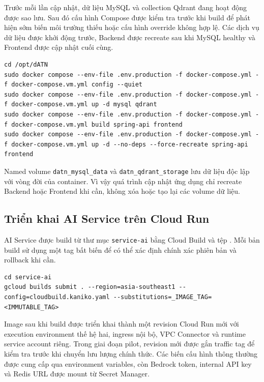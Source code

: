 Trước mỗi lần cập nhật, dữ liệu MySQL và collection Qdrant đang hoạt động được sao lưu. Sau đó cấu hình Compose được kiểm tra trước khi build để phát hiện sớm biến môi trường thiếu hoặc cấu hình override không hợp lệ. Các dịch vụ dữ liệu được khởi động trước, Backend được recreate sau khi MySQL healthy và Frontend được cập nhật cuối cùng.

\begin{lstlisting}[style=terminal,caption={Build và khởi động các dịch vụ trên GCE VM},label={lst:gce-compose-deploy}]
cd /opt/dATN
sudo docker compose --env-file .env.production -f docker-compose.yml -f docker-compose.vm.yml config --quiet
sudo docker compose --env-file .env.production -f docker-compose.yml -f docker-compose.vm.yml up -d mysql qdrant
sudo docker compose --env-file .env.production -f docker-compose.yml -f docker-compose.vm.yml build spring-api frontend
sudo docker compose --env-file .env.production -f docker-compose.yml -f docker-compose.vm.yml up -d --no-deps --force-recreate spring-api frontend
\end{lstlisting}

Named volume \texttt{datn\_mysql\_data} và \texttt{datn\_qdrant\_storage} lưu dữ liệu độc lập với vòng đời của container. Vì vậy quá trình cập nhật ứng dụng chỉ recreate Backend hoặc Frontend khi cần, không xóa hoặc tạo lại các volume dữ liệu.

\subsection{Triển khai AI Service trên Cloud Run}

AI Service được build từ thư mục \texttt{service-ai} bằng Cloud Build và tệp . Mỗi bản build sử dụng một tag bất biến để có thể xác định chính xác phiên bản và rollback khi cần.

\begin{lstlisting}[style=terminal,caption={Build image AI Service bằng Cloud Build},label={lst:cloud-build-ai}]
cd service-ai
gcloud builds submit . --region=asia-southeast1 --config=cloudbuild.kaniko.yaml --substitutions=_IMAGE_TAG=<IMMUTABLE_TAG>
\end{lstlisting}

Image sau khi build được triển khai thành một revision Cloud Run mới với execution environment thế hệ hai, ingress nội bộ, VPC Connector và runtime service account riêng. Trong giai đoạn pilot, revision mới được gắn traffic tag để kiểm tra trước khi chuyển lưu lượng chính thức. Các biến cấu hình thông thường được cung cấp qua environment variables, còn Bedrock token, internal API key và Redis URL được mount từ Secret Manager.

